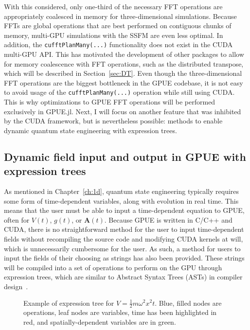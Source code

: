 With this considered, only one-third of the necessary FFT operations are appropriately coalesced in memory for three-dimensional simulations.
Because FFTs are global operations that are best performed on contiguous chunks of memory, multi-GPU simulations with the SSFM are even less optimal.
In addition, the \texttt{cufftPlanMany(...)} functionality does not exist in the CUDA multi-GPU API.
This has motivated the development of other packages to allow for memory coalescence with FFT operations, such as the distributed transpose, which will be described in Section~\ref{sec:DT}.
Even though the three-dimensional FFT operations are the biggest bottleneck in the GPUE codebase, it is not easy to avoid usage of the \texttt{cufftPlanMany(...)} operation while still using CUDA.
This is why optimizations to GPUE FFT operations will be performed exclusively in GPUE.jl.
Next, I will focus on another feature that was inhibited by the CUDA framework, but is nevertheless possible: methods to enable dynamic quantum state engineering with expression trees.

\subsection{Dynamic field input and output in GPUE with expression trees}

\label{sec:expr_trees}
As mentioned in Chapter~\ref{ch:1d}, quantum state engineering typically requires some form of time-dependent variables, along with evolution in real time.
This means that the user must be able to input a time-dependent equation to GPUE, often for $V(t)$, $g(t)$, or $\mathbf{A}(t)$.
Because GPUE is written in C/C++ and CUDA, there is no straightforward method for the user to input time-dependent fields without recompiling the source code and modifying CUDA kernels at will, which is unnecessarily cumbersome for the user.
As such, a method for users to input the fields of their choosing as strings has also been provided.
These strings will be compiled into a set of operations to perform on the GPU through expression trees, which are similar to Abstract Syntax Trees (ASTs) in compiler design~\cite{cohen1991, reyes2011}.

\begin{figure}
\center 
\caption{
Example of expression tree for $V=\frac{1}{2}m \omega^2 x^2 t$.
Blue, filled nodes are operations, leaf nodes are variables, time has been highlighted in red, and spatially-dependent variables are in green.
}
\label{fig:expr_tree}
\end{figure}

